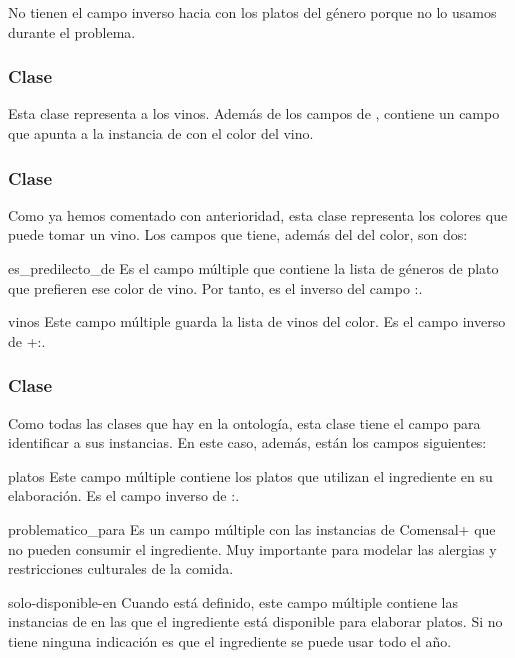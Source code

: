 No tienen el campo inverso hacia  con los platos del género porque
no lo usamos durante el problema.

\subsubsection{Clase }
Esta clase representa a los vinos. Además de los campos de ,
contiene un campo  que apunta a la instancia de 
con el color del vino.

\subsubsection{Clase }
Como ya hemos comentado con anterioridad, esta clase representa los colores que
puede tomar un vino. Los campos que tiene, además del  del color,
son dos:
\begin{slotlist}
\item[es\_predilecto\_de] Es el campo múltiple que contiene la lista de géneros
  de plato que prefieren ese color de vino. Por tanto, es el inverso del campo
  :.
\item[vinos] Este campo múltiple guarda la lista de vinos del color. Es el
  campo inverso de +:.
\end{slotlist}

\subsubsection{Clase }
Como todas las clases que hay en la ontología, esta clase tiene el campo
 para identificar a sus instancias. En este caso, además, están
los campos siguientes:
\begin{slotlist}
\item[platos] Este campo múltiple contiene los platos que utilizan el
  ingrediente en su elaboración. Es el campo inverso de
  :.
\item[problematico\_para] Es un campo múltiple con las instancias de
   Comensal+ que no pueden consumir el ingrediente. Muy importante
  para modelar las alergias y restricciones culturales de la comida.
\item[solo-disponible-en] Cuando está definido, este campo múltiple contiene
  las instancias de  en las que el ingrediente está disponible para
  elaborar platos. Si no tiene ninguna indicación es que el ingrediente se
  puede usar todo el año.
\end{slotlist}

